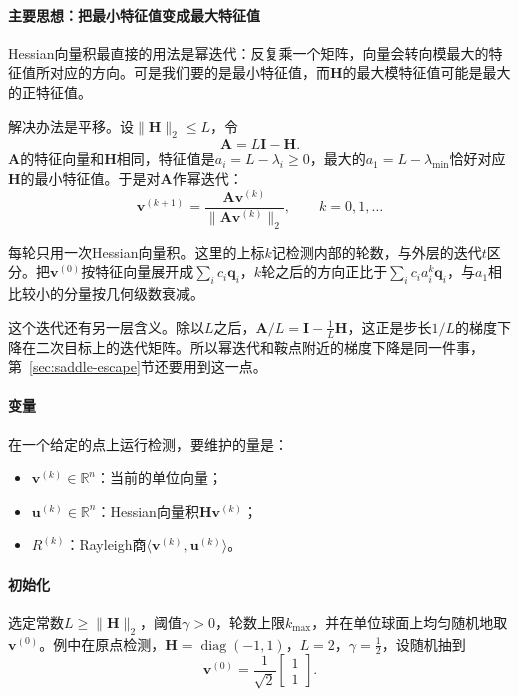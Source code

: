 \paragraph{主要思想：把最小特征值变成最大特征值}
Hessian向量积最直接的用法是幂迭代：反复乘一个矩阵，向量会转向模最大的特征值所对应的方向。可是我们要的是最小特征值，而$\bm{H}$的最大模特征值可能是最大的正特征值。

解决办法是平移。设$\lVert\bm{H}\rVert_2\leq L$，令
\begin{equation}
 \bm{A}=L\bm{I}-\bm{H}.
 \label{eq:saddle-power-shift}
\end{equation}
$\bm{A}$的特征向量和$\bm{H}$相同，特征值是$a_i=L-\lambda_i\geq0$，最大的$a_1=L-\lambda_{\min}$恰好对应$\bm{H}$的最小特征值。于是对$\bm{A}$作幂迭代：
\begin{equation}
 \bm{v}^{(k+1)}=\frac{\bm{A}\bm{v}^{(k)}}{\lVert\bm{A}\bm{v}^{(k)}\rVert_2},\qquad k=0,1,\ldots
 \label{eq:saddle-power-iteration}
\end{equation}

每轮只用一次Hessian向量积。这里的上标$k$记检测内部的轮数，与外层的迭代$t$区分。把$\bm{v}^{(0)}$按特征向量展开成$\sum_ic_i\bm{q}_i$，$k$轮之后的方向正比于$\sum_ic_ia_i^k\bm{q}_i$，与$a_1$相比较小的分量按几何级数衰减。

这个迭代还有另一层含义。除以$L$之后，$\bm{A}/L=\bm{I}-\tfrac1L\bm{H}$，这正是步长$1/L$的梯度下降在二次目标上的迭代矩阵。所以幂迭代和鞍点附近的梯度下降是同一件事，第~\ref{sec:saddle-escape}节还要用到这一点。

\paragraph{变量}
在一个给定的点上运行检测，要维护的量是：
\begin{itemize}
 \item $\bm{v}^{(k)}\in\mathbb{R}^n$：当前的单位向量；
 \item $\bm{u}^{(k)}\in\mathbb{R}^n$：Hessian向量积$\bm{H}\bm{v}^{(k)}$；
 \item $R^{(k)}$：Rayleigh商$\langle\bm{v}^{(k)},\bm{u}^{(k)}\rangle$。
\end{itemize}

\paragraph{初始化}
选定常数$L\geq\lVert\bm{H}\rVert_2$，阈值$\gamma>0$，轮数上限$k_{\max}$，并在单位球面上均匀随机地取$\bm{v}^{(0)}$。例中在原点检测，$\bm{H}=\operatorname{diag}(-1,1)$，$L=2$，$\gamma=\tfrac12$，设随机抽到
\[
 \bm{v}^{(0)}=\frac{1}{\sqrt2}\begin{bmatrix}1\\1\end{bmatrix}.
\]

